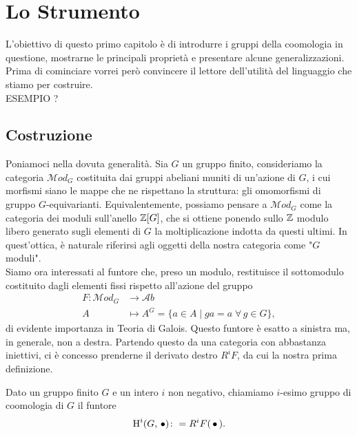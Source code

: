\chapter{Lo Strumento}

L'obiettivo di questo primo capitolo è di introdurre i gruppi della coomologia in questione, mostrarne le principali proprietà e presentare alcune generalizzazioni. Prima di cominciare vorrei però convincere il lettore dell'utilità del linguaggio che stiamo per costruire.\\

ESEMPIO ? \\

\section{Costruzione}

Poniamoci nella dovuta generalità. Sia $ G $ un gruppo finito, consideriamo la categoria $ \mathcal{M}od_G $ costituita dai gruppi abeliani muniti di un'azione di $ G $, i cui morfismi siano le mappe che ne rispettano la struttura: gli omomorfismi di gruppo $ G $-equivarianti. Equivalentemente, possiamo pensare a $ \mathcal{M}od_G $ come la categoria dei moduli sull'anello $ \mathbb{Z}[G] $, che si ottiene ponendo sullo $ \mathbb{Z} $ modulo libero generato sugli elementi di $ G $ la moltiplicazione indotta da questi ultimi. In quest'ottica, è naturale riferirsi agli oggetti della nostra categoria come "$ G $ moduli". \\

Siamo ora interessati al funtore che, preso un modulo, restituisce il sottomodulo costituito dagli elementi fissi rispetto  all'azione del gruppo
\begin{align*} 
	F \colon \mathcal{M}od_G &\to \mathcal{A}b \\
	 A &\mapsto A^G = \{ a \in A \mid ga = a \; \forall \, g \in G \},
\end{align*}
di evidente importanza in Teoria di Galois. Questo funtore è esatto a sinistra ma, in generale, non a destra. Partendo questo da una categoria con abbastanza iniettivi, ci è concesso prenderne il derivato destro $ R^iF $, da cui la nostra prima definizione.

\begin{definition}
	Dato un gruppo finito $ G $ e un intero $ i $ non negativo, chiamiamo $ i $-esimo gruppo di coomologia di $ G $ il funtore
	\[ \operatorname{H}^i(G, \, \bullet) \colon = R^iF(\,\bullet\,). \]
\end{definition}


